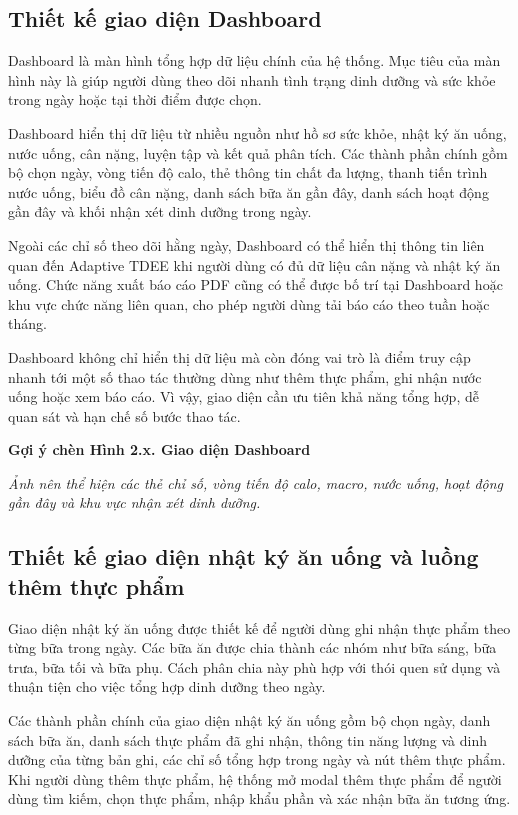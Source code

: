 \documentclass[12pt, a4paper]{report}
\begin{document}
\subsection{Thiết kế giao diện Dashboard}Dashboard là màn hình tổng hợp dữ liệu chính của hệ thống. Mục tiêu của màn hình này là giúp người dùng theo dõi nhanh tình trạng dinh dưỡng và sức khỏe trong ngày hoặc tại thời điểm được chọn.

Dashboard hiển thị dữ liệu từ nhiều nguồn như hồ sơ sức khỏe, nhật ký ăn uống, nước uống, cân nặng, luyện tập và kết quả phân tích. Các thành phần chính gồm bộ chọn ngày, vòng tiến độ calo, thẻ thông tin chất đa lượng, thanh tiến trình nước uống, biểu đồ cân nặng, danh sách bữa ăn gần đây, danh sách hoạt động gần đây và khối nhận xét dinh dưỡng trong ngày.

Ngoài các chỉ số theo dõi hằng ngày, Dashboard có thể hiển thị thông tin liên quan đến Adaptive TDEE khi người dùng có đủ dữ liệu cân nặng và nhật ký ăn uống. Chức năng xuất báo cáo PDF cũng có thể được bố trí tại Dashboard hoặc khu vực chức năng liên quan, cho phép người dùng tải báo cáo theo tuần hoặc tháng.

Dashboard không chỉ hiển thị dữ liệu mà còn đóng vai trò là điểm truy cập nhanh tới một số thao tác thường dùng như thêm thực phẩm, ghi nhận nước uống hoặc xem báo cáo. Vì vậy, giao diện cần ưu tiên khả năng tổng hợp, dễ quan sát và hạn chế số bước thao tác.

\textbf{Gợi ý chèn Hình 2.x. Giao diện Dashboard}

\textit{Ảnh nên thể hiện các thẻ chỉ số, vòng tiến độ calo, macro, nước uống, hoạt động gần đây và khu vực nhận xét dinh dưỡng.}

\subsection{Thiết kế giao diện nhật ký ăn uống và luồng thêm thực phẩm}Giao diện nhật ký ăn uống được thiết kế để người dùng ghi nhận thực phẩm theo từng bữa trong ngày. Các bữa ăn được chia thành các nhóm như bữa sáng, bữa trưa, bữa tối và bữa phụ. Cách phân chia này phù hợp với thói quen sử dụng và thuận tiện cho việc tổng hợp dinh dưỡng theo ngày.

Các thành phần chính của giao diện nhật ký ăn uống gồm bộ chọn ngày, danh sách bữa ăn, danh sách thực phẩm đã ghi nhận, thông tin năng lượng và dinh dưỡng của từng bản ghi, các chỉ số tổng hợp trong ngày và nút thêm thực phẩm. Khi người dùng thêm thực phẩm, hệ thống mở modal thêm thực phẩm để người dùng tìm kiếm, chọn thực phẩm, nhập khẩu phần và xác nhận bữa ăn tương ứng.
\end{document}
